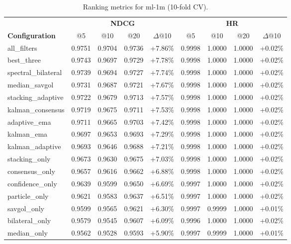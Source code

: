 \begin{table}[htbp]
\centering
\caption{Ranking metrics for ml-1m (10-fold CV).}
\label{tab:ranking-ml-1m}
\begin{adjustbox}{max width=\textwidth}
\begin{tabular}{l cccc cccc}
\toprule
& \multicolumn{4}{c}{\textbf{NDCG}} & \multicolumn{4}{c}{\textbf{HR}} \\
\cmidrule(lr){2-5} \cmidrule(lr){6-9}
\textbf{Configuration} & @5 & @10 & @20 & $\Delta$@10 & @5 & @10 & @20 & $\Delta$@10 \\
\midrule
all\_filters & 0.9751 & 0.9704 & 0.9736 & +7.86\% & 0.9998 & 1.0000 & 1.0000 & +0.02\% \\
best\_three & 0.9743 & 0.9697 & 0.9729 & +7.78\% & 0.9998 & 1.0000 & 1.0000 & +0.02\% \\
spectral\_bilateral & 0.9739 & 0.9694 & 0.9727 & +7.74\% & 0.9998 & 1.0000 & 1.0000 & +0.02\% \\
median\_savgol & 0.9731 & 0.9687 & 0.9721 & +7.67\% & 0.9998 & 1.0000 & 1.0000 & +0.02\% \\
stacking\_adaptive & 0.9722 & 0.9679 & 0.9713 & +7.57\% & 0.9998 & 1.0000 & 1.0000 & +0.02\% \\
kalman\_consensus & 0.9719 & 0.9675 & 0.9711 & +7.53\% & 0.9998 & 1.0000 & 1.0000 & +0.02\% \\
adaptive\_ema & 0.9711 & 0.9665 & 0.9703 & +7.42\% & 0.9998 & 1.0000 & 1.0000 & +0.02\% \\
kalman\_ema & 0.9697 & 0.9653 & 0.9693 & +7.29\% & 0.9998 & 1.0000 & 1.0000 & +0.02\% \\
kalman\_adaptive & 0.9693 & 0.9646 & 0.9688 & +7.21\% & 0.9998 & 1.0000 & 1.0000 & +0.02\% \\
stacking\_only & 0.9673 & 0.9630 & 0.9675 & +7.03\% & 0.9998 & 1.0000 & 1.0000 & +0.02\% \\
consensus\_only & 0.9657 & 0.9616 & 0.9662 & +6.88\% & 0.9998 & 1.0000 & 1.0000 & +0.02\% \\
confidence\_only & 0.9639 & 0.9599 & 0.9650 & +6.69\% & 0.9997 & 1.0000 & 1.0000 & +0.02\% \\
particle\_only & 0.9621 & 0.9583 & 0.9637 & +6.51\% & 0.9997 & 1.0000 & 1.0000 & +0.02\% \\
savgol\_only & 0.9599 & 0.9565 & 0.9621 & +6.30\% & 0.9997 & 0.9999 & 1.0000 & +0.01\% \\
bilateral\_only & 0.9579 & 0.9545 & 0.9607 & +6.09\% & 0.9996 & 1.0000 & 1.0000 & +0.02\% \\
median\_only & 0.9562 & 0.9528 & 0.9593 & +5.90\% & 0.9997 & 0.9999 & 1.0000 & +0.01\% \\

\end{tabular}
\end{adjustbox}
\end{table}
